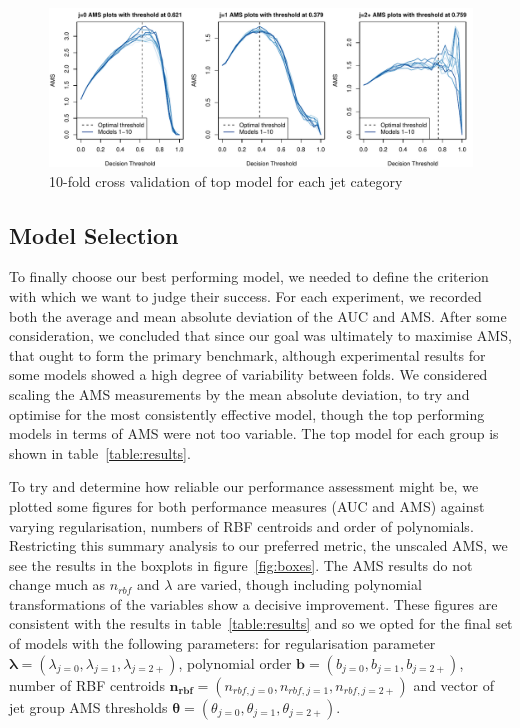 \begin{figure}[htbp]
    \begin{adjustbox}{max width=1.4\linewidth,center}
    \centering
	\includegraphics[width=1.2\textwidth]{CV_LogReg_AMS}
    \end{adjustbox}
    \caption{10-fold cross validation of top model for each jet category}
    \label{fig:ams_curve}
\end{figure}


\subsection{Model Selection}
To finally choose our best performing model, we needed to define the criterion with which we want to judge their success. For each experiment, we recorded both the average and mean absolute deviation of the AUC and AMS. After some consideration, we concluded that since our goal was ultimately to maximise AMS, that ought to form the primary benchmark, although experimental results for some models showed a high degree of variability between folds. We considered scaling the AMS measurements by the mean absolute deviation, to try and optimise for the most consistently effective model, though the top performing models in terms of AMS were not too variable. The top model for each group is shown in table~\ref{table:results}. 


To try and determine how reliable our performance assessment might be, we plotted some figures for both performance measures (AUC and AMS) against varying regularisation, numbers of RBF centroids and order of polynomials. Restricting this summary analysis to our preferred metric, the unscaled AMS, we see the results in the boxplots in figure~\ref{fig:boxes}. The AMS results do not change much as $n_{rbf}$ and $\lambda$ are varied, though including polynomial transformations of the variables show a decisive improvement. These figures are consistent with the results in table~\ref{table:results} and so we opted for the final set of models with the following parameters:
for regularisation parameter $\boldsymbol{\lambda}=(\lambda_{j=0}, \lambda_{j=1}, \lambda_{j=2+})$, polynomial order $\bm{b}=(b_{j=0}, b_{j=1}, b_{j=2+})$, number of RBF centroids $\bm{n_{rbf}}=(n_{rbf,j=0}, n_{rbf,j=1}, n_{rbf,j=2+})$ and vector of jet group AMS thresholds $\bm{\theta} = (\theta_{j=0}, \theta_{j=1}, \theta_{j=2+})$.

